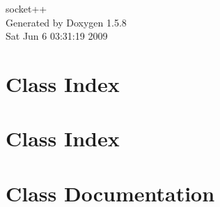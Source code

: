 \documentclass[a4paper]{book}
\begin{document}
\begin{titlepage}
\vspace*{7cm}
\begin{center}
{\Large socket++ }\\
\vspace*{1cm}
{\large Generated by Doxygen 1.5.8}\\
\vspace*{0.5cm}
{\small Sat Jun 6 03:31:19 2009}\\
\end{center}
\end{titlepage}
\clearemptydoublepage
{}
\tableofcontents
\clearemptydoublepage
{}
\chapter{Class Index}

\chapter{Class Index}

\chapter{Class Documentation}





















\printindex
\end{document}
